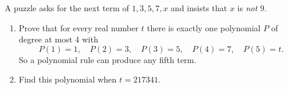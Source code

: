 A puzzle asks for the next term of $1,3,5,7,x$ and insists that $x$ is \emph{not} $9$.
\begin{enumerate}
\item[(a)] Prove that for every real number $t$ there is exactly one polynomial $P$ of degree at most $4$ with
\[P(1)=1,\quad P(2)=3,\quad P(3)=5,\quad P(4)=7,\quad P(5)=t.\]
So a polynomial rule can produce any fifth term.
\item[(b)] Find this polynomial when $t=217341$.
\end{enumerate}
